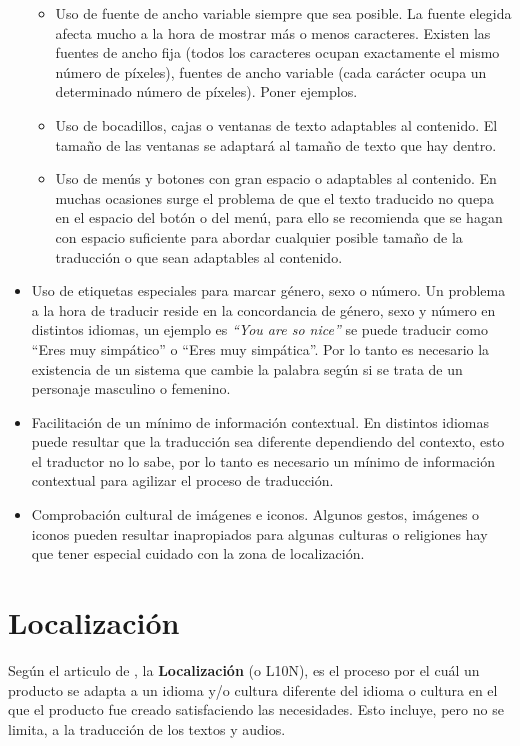 \begin{itemize}
	\begin{itemize}
		\item Uso de fuente de ancho variable siempre que sea posible. La fuente elegida afecta mucho a la hora de mostrar más o menos caracteres. Existen las fuentes de ancho fija (todos los caracteres ocupan exactamente el mismo número de píxeles), fuentes de ancho variable (cada carácter ocupa un determinado número de píxeles). Poner ejemplos.
		\item Uso de bocadillos, cajas o ventanas de texto adaptables al contenido. El tamaño de las ventanas se adaptará al tamaño de texto que hay dentro.
		\item Uso de menús y botones con gran espacio o adaptables al contenido. En muchas ocasiones surge el problema de que el texto traducido no quepa en el espacio del botón o del menú, para ello se recomienda que se hagan con espacio suficiente para abordar cualquier posible tamaño de la traducción o que sean adaptables al contenido.
	\end{itemize}
	\item Uso de etiquetas especiales para marcar género, sexo o número. Un problema a la hora de traducir reside en la concordancia de género, sexo y número en distintos idiomas, un ejemplo es \textit{``You are so nice''} se puede traducir como ``Eres muy simpático'' o ``Eres muy simpática''. Por lo tanto es necesario la existencia de un sistema que cambie la palabra según si se trata de un personaje masculino o femenino.
	
	\item Facilitación de un mínimo de información contextual. En distintos idiomas puede resultar que la traducción sea diferente dependiendo del contexto, esto el traductor no lo sabe, por lo tanto es necesario un mínimo de información contextual para agilizar el proceso de traducción.
	
	\item Comprobación cultural de imágenes e iconos. Algunos gestos, imágenes o iconos pueden resultar inapropiados para algunas culturas o religiones hay que tener especial cuidado con la zona de localización.
\end{itemize}


\section{Localización}
\label{sec:Localization}

Según el articulo de \cite{Localization}, la \textbf{Localización} (o L10N), es el proceso por el cuál un producto se adapta a un idioma y/o cultura diferente del idioma o cultura en el que el producto fue creado satisfaciendo las necesidades. Esto incluye, pero no se limita, a la traducción de los textos y audios. 

